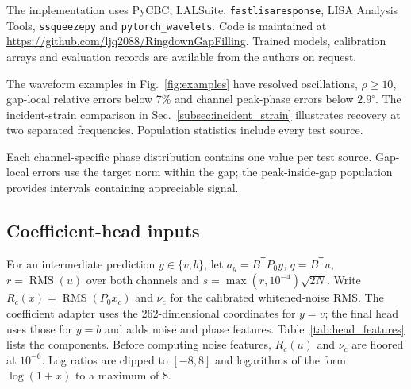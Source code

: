 \documentclass[10pt,prd,aps,a4paper,twocolumn,superscriptaddress,nofootinbib,floatfix]{revtex4-2}
\begin{document}
The implementation uses PyCBC, LALSuite, \texttt{fastlisaresponse}, LISA Analysis Tools, \texttt{ssqueezepy} and \texttt{pytorch\_wavelets}. Code is maintained at \url{https://github.com/ljq2088/RingdownGapFilling}. Trained models, calibration arrays and evaluation records are available from the authors on request.

The waveform examples in Fig.~\ref{fig:examples} have resolved oscillations, $\rho\ge10$, gap-local relative errors below 7\% and channel peak-phase errors below $2.9^\circ$. The incident-strain comparison in Sec.~\ref{subsec:incident_strain} illustrates recovery at two separated frequencies. Population statistics include every test source.

Each channel-specific phase distribution contains one value per test source. Gap-local errors use the target norm within the gap; the peak-inside-gap population provides intervals containing appreciable signal.


\subsection{Coefficient-head inputs}
For an intermediate prediction $y\in\{v,b\}$, let $a_y=B^{\mathsf T}P_0y$, $q=B^{\mathsf T}u$, $r=\operatorname{RMS}(u)$ over both channels and $s=\max(r,10^{-4})\sqrt{2N}$. Write $R_c(x)=\operatorname{RMS}(P_0x_c)$ and $\nu_c$ for the calibrated whitened-noise RMS. The coefficient adapter uses the 262-dimensional coordinates for $y=v$; the final head uses those for $y=b$ and adds noise and phase features. Table~\ref{tab:head_features} lists the components. Before computing noise features, $R_c(u)$ and $\nu_c$ are floored at $10^{-6}$. Log ratios are clipped to $[-8,8]$ and logarithms of the form $\log(1+x)$ to a maximum of 8.
\end{document}
